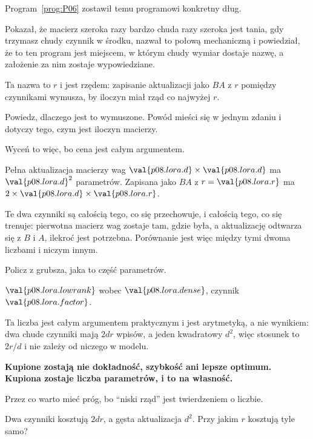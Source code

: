 \begin{fr}
Program~\ref{prog:P06} zostawił temu programowi konkretny dług.

Pokazał, że macierz szeroka razy bardzo chuda razy szeroka jest tania, gdy
trzymasz chudy czynnik w środku, nazwał to połową mechaniczną i powiedział, że
to ten program jest miejscem, w którym chudy wymiar dostaje nazwę, a założenie
za nim zostaje wypowiedziane.

Ta nazwa to $r$ i jest rzędem: zapisanie aktualizacji jako $BA$ z $r$ pomiędzy
czynnikami wymusza, by iloczyn miał rząd co najwyżej $r$.

Powiedz, dlaczego jest to wymuszone. Powód mieści się w jednym zdaniu i
dotyczy tego, czym jest iloczyn macierzy.
\dotline
\nextframe
\end{fr}

\begin{fr}
Wyceń to więc, bo cena jest całym argumentem.

Pełna aktualizacja macierzy wag $\val{p08.lora.d} \times \val{p08.lora.d}$ ma
$\val{p08.lora.d}^{2}$ parametrów. Zapisana jako $BA$ z $r =
\val{p08.lora.r}$ ma $2 \times \val{p08.lora.d} \times \val{p08.lora.r}$.

Te dwa czynniki są całością tego, co się przechowuje, i całością tego, co się
trenuje: pierwotna macierz wag zostaje tam, gdzie była, a aktualizację odtwarza
się z $B$ i $A$, ilekroć jest potrzebna. Porównanie jest więc między tymi dwoma
liczbami i niczym innym.

Policz z grubsza, jaka to część parametrów.
\dotline
\nextframe
\end{fr}

\begin{fr}
$\val{p08.lora.lowrank}$ wobec $\val{p08.lora.dense}$, czynnik
$\val{p08.lora.factor}$.

Ta liczba jest całym argumentem praktycznym i jest arytmetyką, a nie wynikiem:
dwa chude czynniki mają $2dr$ wpisów, a jeden kwadratowy $d^{2}$, więc stosunek
to $2r/d$ i nie zależy od niczego w modelu.

\textbf{Kupione zostają nie dokładność, szybkość ani lepsze optimum. Kupiona
zostaje liczba parametrów, i to na własność.}
\end{fr}

\begin{fr}
Przez co warto mieć próg, bo \enquote{niski rząd}
jest twierdzeniem o liczbie.

Dwa czynniki kosztują $2dr$, a gęsta aktualizacja $d^{2}$. Przy jakim $r$
kosztują tyle samo?
\dotline
\nextframe
\end{fr}

